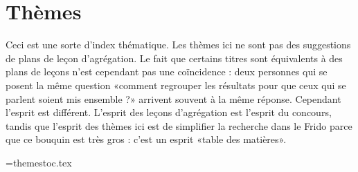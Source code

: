 
\section*{Thèmes}

Ceci est une sorte d'index thématique. Les thèmes ici ne sont pas des suggestions de plans de leçon d'agrégation. Le fait que certains titres sont équivalents à des plans de leçons n'est cependant pas une coïncidence : deux personnes qui se posent la même question «comment regrouper les résultats pour que ceux qui se parlent soient mis ensemble ?» arrivent souvent à la même réponse. Cependant l'esprit est différent. L'esprit des leçons d'agrégation est l'esprit du concours, tandis que l'esprit des thèmes ici est de simplifier la recherche dans le Frido parce que ce bouquin est très gros : c'est un esprit «table des matières».



\begin{multicols}{2}
\noindent

\end{multicols}

\newwrite\themetoc      
\immediate\openout\themetoc=themestoc.tex







